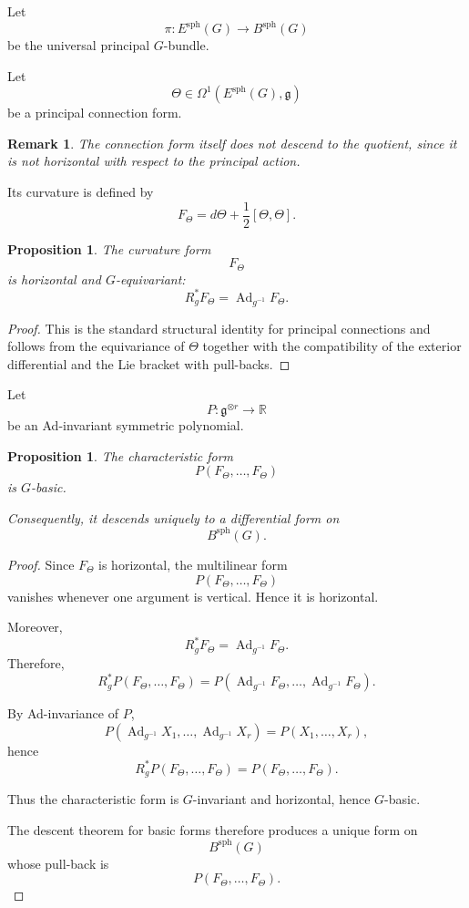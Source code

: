 \documentclass[11pt]{amsart}
\newtheorem{proposition}[definition]{Proposition}
\newtheorem{remark}[definition]{Remark}
\begin{document}
Let
\[
\pi:
E^{\mathrm{sph}}(G)\to B^{\mathrm{sph}}(G)
\]
be the universal principal \(G\)-bundle.

Let
\[
\Theta
\in
\Omega^1(E^{\mathrm{sph}}(G),\mathfrak g)
\]
be a principal connection form.

\begin{remark}
The connection form itself does not descend to the quotient, since it is not
horizontal with respect to the principal action.
\end{remark}

Its curvature is defined by
\[
F_\Theta
=
d\Theta
+
\frac12[\Theta,\Theta].
\]

\begin{proposition}
The curvature form
\[
F_\Theta
\]
is horizontal and \(G\)-equivariant:
\[
R_g^*F_\Theta
=
\operatorname{Ad}_{g^{-1}}F_\Theta.
\]
\end{proposition}

\begin{proof}
This is the standard structural identity for principal connections and follows
from the equivariance of \(\Theta\) together with the compatibility of the
exterior differential and the Lie bracket with pull-backs.
\end{proof}

Let
\[
P:\mathfrak g^{\otimes r}\to\mathbb R
\]
be an Ad-invariant symmetric polynomial.

\begin{proposition}
The characteristic form
\[
P(F_\Theta,\dots,F_\Theta)
\]
is \(G\)-basic.

Consequently, it descends uniquely to a differential form on
\[
B^{\mathrm{sph}}(G).
\]
\end{proposition}

\begin{proof}
Since \(F_\Theta\) is horizontal, the multilinear form
\[
P(F_\Theta,\dots,F_\Theta)
\]
vanishes whenever one argument is vertical. Hence it is horizontal.

Moreover,
\[
R_g^*F_\Theta
=
\operatorname{Ad}_{g^{-1}}F_\Theta.
\]
Therefore,
\[
R_g^*P(F_\Theta,\dots,F_\Theta)
=
P(
\operatorname{Ad}_{g^{-1}}F_\Theta,
\dots,
\operatorname{Ad}_{g^{-1}}F_\Theta
).
\]

By Ad-invariance of \(P\),
\[
P(
\operatorname{Ad}_{g^{-1}}X_1,
\dots,
\operatorname{Ad}_{g^{-1}}X_r
)
=
P(X_1,\dots,X_r),
\]
hence
\[
R_g^*P(F_\Theta,\dots,F_\Theta)
=
P(F_\Theta,\dots,F_\Theta).
\]

Thus the characteristic form is \(G\)-invariant and horizontal, hence
\(G\)-basic.

The descent theorem for basic forms therefore produces a unique form on
\[
B^{\mathrm{sph}}(G)
\]
whose pull-back is
\[
P(F_\Theta,\dots,F_\Theta).
\]
\end{proof}
\end{document}
